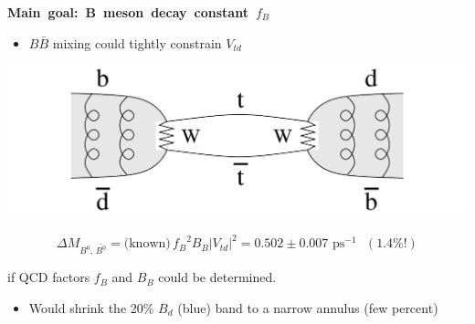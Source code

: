 \documentclass[landscape]{article}
\newenvironment{slide}[1][ ]{\mbox{\bf #1 } \vfill}{\vfill \mbox{ } \pagebreak}
\begin{document}





\begin{slide}[Main goal: B meson decay constant \boldmath $f_B$]

\begin{minipage}{14 cm} \begin{itemize} \item $B\bar{B}$ mixing could tightly constrain $V_{td}$ \end{itemize} \end{minipage} \hfill \begin{minipage}{10 cm} \begin{center} \includegraphics[width=10 cm]{diagram_bmixing} \end{center} \end{minipage}
\[ \Delta M_{B^0,\,\bar{B^0}} = \mbox{(known)} \, {f_B}^2 B_B |V_{td}|^2 = 0.502 \pm 0.007 \mbox{ ps}^{-1} \mbox{ } (1.4\%!) \]

\vspace{0.5 cm}
\mbox{\hspace{0.8 cm}} if QCD factors $f_B$ and $B_B$ could be determined.

\vfill

\begin{minipage}{14 cm}
\color{white} \begin{itemize}
\item Would shrink the 20\% $B_d$ (blue) band to a narrow annulus (few percent)

\vspace{1 cm}


\end{itemize}
\end{minipage}
\end{slide}
\end{document}
